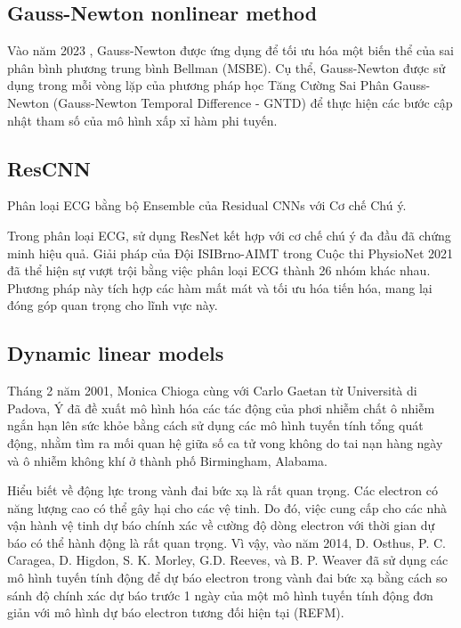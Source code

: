 \documentclass[conference]{IEEEtran}
\begin{document}
\subsection{Gauss-Newton nonlinear method}

Vào năm 2023 , Gauss-Newton được ứng dụng để tối ưu hóa một biến thể của sai phân bình phương trung bình Bellman (MSBE). Cụ thể, Gauss-Newton được sử dụng trong mỗi vòng lặp của phương pháp học Tăng Cường Sai Phân Gauss-Newton (Gauss-Newton Temporal Difference - GNTD) để thực hiện các bước cập nhật tham số của mô hình xấp xỉ hàm phi tuyến.\cite{b1}

\subsection{ResCNN}
Phân loại ECG bằng bộ Ensemble của Residual CNNs với Cơ chế Chú ý.

Trong phân loại ECG, sử dụng ResNet kết hợp với cơ chế chú ý đa đầu đã chứng minh hiệu quả. Giải pháp của Đội ISIBrno-AIMT trong Cuộc thi PhysioNet 2021 đã thể hiện sự vượt trội bằng việc phân loại ECG thành 26 nhóm khác nhau. Phương pháp này tích hợp các hàm mất mát và tối ưu hóa tiến hóa, mang lại đóng góp quan trọng cho lĩnh vực này. \cite{b4}

\subsection{Dynamic linear models}
Tháng 2 năm 2001, Monica Chioga cùng với Carlo Gaetan từ Università di Padova, Ý đã đề xuất mô hình hóa các tác động của phơi nhiễm chất ô nhiễm ngắn hạn lên sức khỏe bằng cách sử dụng các mô hình tuyến tính tổng quát động, nhằm tìm ra mối quan hệ giữa số ca tử vong không do tai nạn hàng ngày và ô nhiễm không khí ở thành phố Birmingham, Alabama. \cite{b5}

Hiểu biết về động lực trong vành đai bức xạ là rất quan trọng. Các electron có năng lượng cao có thể gây hại cho các vệ tinh. Do đó, việc cung cấp cho các nhà vận hành vệ tinh dự báo chính xác về cường độ dòng electron với thời gian dự báo có thể hành động là rất quan trọng. Vì vậy, vào năm 2014, D. Osthus, P. C. Caragea, D. Higdon, S. K. Morley, G.D. Reeves, và B. P. Weaver đã sử dụng các mô hình tuyến tính động để dự báo electron trong vành đai bức xạ bằng cách so sánh độ chính xác dự báo trước 1 ngày của một mô hình tuyến tính động đơn giản với mô hình dự báo electron tương đối hiện tại (REFM). \cite{b6}
\end{document}

